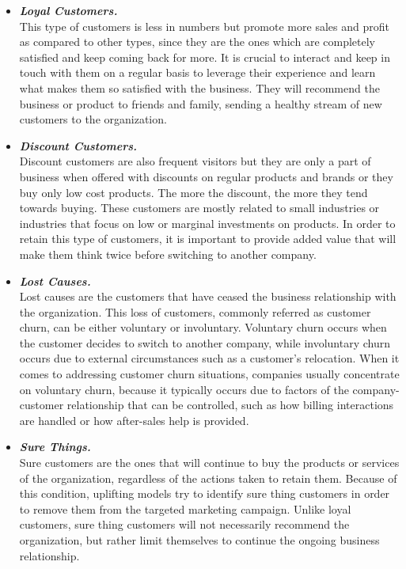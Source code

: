 \documentclass{article}
\begin{document}
\begin{enumerate}[label=(\alph*)]
\begin{enumerate}[label=\arabic*.]
\begin{itemize}
    \item \textit{\textbf{Loyal Customers.}}\\
    This type of customers is less in numbers but promote more sales and profit as compared to other types, since they are the ones which are completely satisfied and keep coming back for more. It is crucial to interact and keep in touch with them on a regular basis to leverage their experience and learn what makes them so satisfied with the business. They will recommend the business or product to friends and family, sending a healthy stream of new customers to the organization.
    \item \textit{\textbf{Discount Customers.}}\\
    Discount customers are also frequent visitors but they are only a part of business when offered with discounts on regular products and brands or they buy only low cost products. The more the discount, the more they tend towards buying. These customers are mostly related to small industries or industries that focus on low or marginal investments on products. In order to retain this type of customers, it is important to provide added value that will make them think twice before switching to another company.
    \item \textit{\textbf{Lost Causes.}}\\
    Lost causes are the customers that have ceased the business relationship with the organization. This loss of customers, commonly referred as customer churn, can be either voluntary or involuntary. Voluntary churn occurs when the customer decides to switch to another company, while involuntary churn occurs due to external circumstances such as a customer's relocation. When it comes to addressing customer churn situations, companies usually concentrate on voluntary churn, because it typically occurs due to factors of the company-customer relationship that can be controlled, such as how billing interactions are handled or how after-sales help is provided.
    \item \textit{\textbf{Sure Things.}}\\
    Sure customers are the ones that will continue to buy the products or services of the organization, regardless of the actions taken to retain them. Because of this condition, uplifting models try to identify sure thing customers in order to remove them from the targeted marketing campaign. Unlike loyal customers, sure thing customers will not necessarily recommend the organization, but rather limit themselves to continue the ongoing  business relationship.

\end{itemize}
\end{enumerate}
\end{enumerate}
\end{document}
